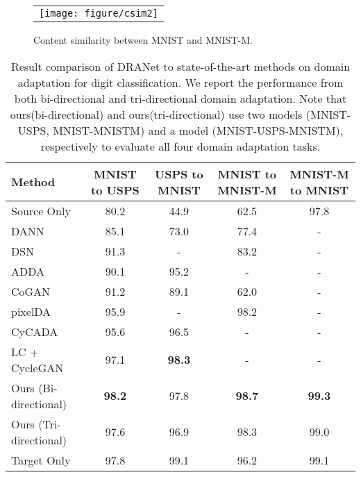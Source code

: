 \documentclass[final]{cvpr}
\begin{document}
\begin{figure}[t] 
	\centering
	\begin{tabular}{c@{\hspace{1mm}}}
    \texttt{[image: figure/csim2]} 
    \end{tabular}
	\caption{Content similarity between MNIST and MNIST-M.}
	\label{fig:confusion}
	\vspace{-3mm}
\end{figure}


\begin{table*}[t]
\begin{center}
\small
\begin{tabular}{lcccc}
\hline
\textbf{Method} & \textbf{MNIST to USPS} & \textbf{USPS to MNIST} & \textbf{MNIST to MNIST-M} & \textbf{MNIST-M to MNIST}  \\
\hline
Source Only~ & 80.2 & 44.9 & 62.5 & 97.8 \\
DANN~\cite{ganin2016domain} & 85.1 & 73.0 & 77.4 & -  \\
DSN~\cite{bousmalis2016domain} & 91.3 & - & 83.2 & -  \\
ADDA~\cite{tzeng2017adversarial} & 90.1 & 95.2 & - & -  \\
CoGAN~\cite{liu2016coupled} & 91.2 & 89.1 & 62.0 & -  \\
pixelDA~\cite{bousmalis2017unsupervised} & 95.9 & - & 98.2 & -  \\
CyCADA~\cite{hoffman2018cycada} & 95.6 & 96.5 & - & -  \\
LC + CycleGAN~\cite{ye2020light, zhu2017unpaired} & 97.1 & \textbf{98.3} & - & - \\
\hline
Ours (Bi-directional) & \textbf{98.2} & 97.8 & \textbf{98.7} & \textbf{99.3} \\
Ours (Tri-directional) & 97.6 & 96.9 & 98.3 & 99.0 \\
\hline
Target Only~ & 97.8 & 99.1 & 96.2 & 99.1 \\
\hline
\end{tabular}
\end{center}
\caption{Result comparison of DRANet to state-of-the-art methods on domain adaptation for digit classification. We report the performance from both bi-directional and tri-directional domain adaptation. Note that ours(bi-directional) and ours(tri-directional) use two models (MNIST-USPS, MNIST-MNISTM) and a model (MNIST-USPS-MNISTM), respectively to evaluate all four domain adaptation tasks.}
\label{tab:digit}
\end{table*}
\end{document}
